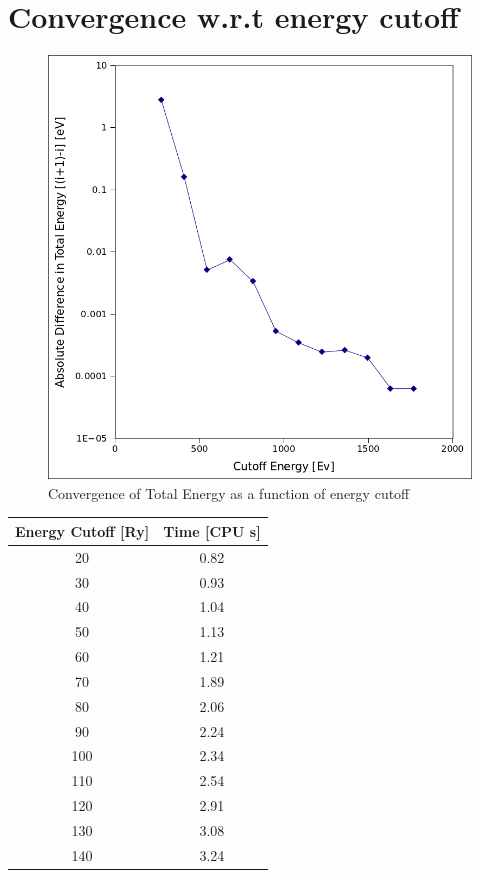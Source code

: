 \documentclass{article}
\begin{document}
\section*{Convergence w.r.t energy cutoff}
\begin{figure}[h!]
\centering
\includegraphics[totalheight=0.5\textheight]{ecut.png}
\caption{Convergence of Total Energy as a function of energy cutoff}
\label{fig:aNicePicture}
\end{figure}
\begin{center}
\begin{tabular}{|c|c|}
  \hline
  Energy Cutoff [Ry] & Time [CPU s] \\ \hline
 20  &   0.82   \\ \hline
 30  &   0.93	\\ \hline
 40  &   1.04 	\\ \hline
 50  &   1.13	\\ \hline
 60  &   1.21	\\ \hline
 70  &   1.89	\\ \hline
 80  &   2.06 	\\ \hline
 90  &   2.24	\\ \hline
 100 &   2.34  	\\ \hline
 110 &   2.54	\\ \hline
 120 &   2.91	\\ \hline
 130 &   3.08	\\ \hline
 140 &   3.24   \\ \hline     
\end{tabular}
\end{center}
\end{document}
